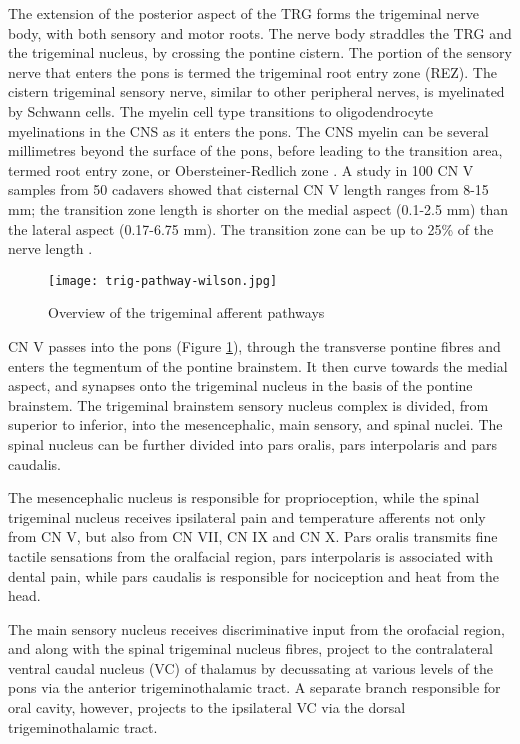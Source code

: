 The extension of the posterior aspect of the TRG forms the trigeminal nerve body, with both sensory and motor roots. The nerve body straddles the TRG and the trigeminal nucleus, by crossing the pontine cistern. The portion of the sensory nerve that enters the pons is termed the trigeminal root entry zone (REZ). The cistern trigeminal sensory nerve, similar to other peripheral nerves, is myelinated by Schwann cells. The myelin cell type transitions to oligodendrocyte myelinations in the CNS as it enters the pons. The CNS myelin can be several millimetres beyond the surface of the pons, before leading to the transition area, termed root entry zone, or Obersteiner-Redlich zone \cite{Peker2006}. A study in 100 CN V samples from 50 cadavers showed that cisternal CN V length ranges from 8-15 mm; the transition zone length is shorter on the medial aspect (0.1-2.5 mm) than the lateral aspect (0.17-6.75 mm). The transition zone can be up to 25\% of the nerve length \cite{Peker2006}. 

 \begin{figure}[ht]
 \texttt{[image: trig-pathway-wilson.jpg]}
 \centering
 \caption{Overview of the trigeminal afferent pathways \protect\cite{wilson2010cranial}}
 \label{fig:trig-pathway}
 \end{figure}
 
CN V passes into the pons (Figure \ref{fig:trig-pathway}), through the transverse pontine fibres and enters the tegmentum of the pontine brainstem. It then curve towards the medial aspect, and synapses onto the trigeminal nucleus in the basis of the pontine brainstem. The trigeminal brainstem sensory nucleus complex is divided, from superior to inferior, into the mesencephalic, main sensory, and spinal nuclei. The spinal nucleus can be further divided into pars oralis, pars interpolaris and pars caudalis. 

The mesencephalic nucleus is responsible for proprioception, while the spinal trigeminal nucleus receives ipsilateral pain and temperature afferents not only from CN V, but also from CN VII, CN IX and CN X. Pars oralis transmits fine tactile sensations from the oralfacial region, pars interpolaris is associated with dental pain, while pars caudalis is responsible for nociception and heat from the head. 

The main sensory nucleus receives discriminative input from the orofacial region, and along with the spinal trigeminal nucleus fibres, project to the contralateral ventral caudal nucleus (VC) of thalamus by decussating at various levels of the pons via the anterior trigeminothalamic tract. A separate branch responsible for oral cavity, however, projects to the ipsilateral VC via the dorsal trigeminothalamic tract.  


